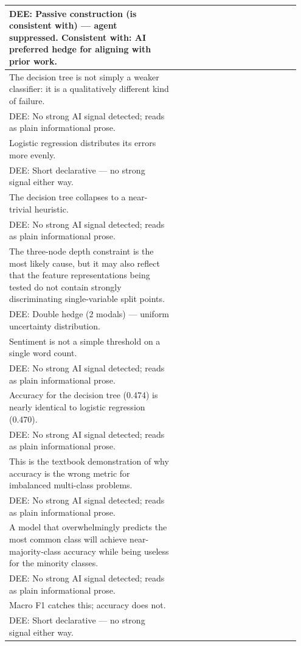 \documentclass[11pt]{article}
\begin{document}
\begin{longtable}{|p{0.55\linewidth}|p{0.40\linewidth}|}
\hline
DEE: Passive construction (is consistent with) --- agent suppressed. Consistent with: AI preferred hedge for aligning with prior work. & \\
\hline
The decision tree is not simply a weaker classifier: it is a qualitatively different kind of failure. & \\[2pt]
\hline
DEE: No strong AI signal detected; reads as plain informational prose. & \\
\hline
Logistic regression distributes its errors more evenly. & \\[2pt]
\hline
DEE: Short declarative --- no strong signal either way. & \\
\hline
The decision tree collapses to a near-trivial heuristic. & \\[2pt]
\hline
DEE: No strong AI signal detected; reads as plain informational prose. & \\
\hline
The three-node depth constraint is the most likely cause, but it may also reflect that the feature representations being tested do not contain strongly discriminating single-variable split points. & \\[2pt]
\hline
DEE: Double hedge (2 modals) --- uniform uncertainty distribution. & \\
\hline
Sentiment is not a simple threshold on a single word count. & \\[2pt]
\hline
DEE: No strong AI signal detected; reads as plain informational prose. & \\
\hline
Accuracy for the decision tree (0.474) is nearly identical to logistic regression (0.470). & \\[2pt]
\hline
DEE: No strong AI signal detected; reads as plain informational prose. & \\
\hline
This is the textbook demonstration of why accuracy is the wrong metric for imbalanced multi-class problems. & \\[2pt]
\hline
DEE: No strong AI signal detected; reads as plain informational prose. & \\
\hline
A model that overwhelmingly predicts the most common class will achieve near-majority-class accuracy while being useless for the minority classes. & \\[2pt]
\hline
DEE: No strong AI signal detected; reads as plain informational prose. & \\
\hline
Macro F1 catches this; accuracy does not. & \\[2pt]
\hline
DEE: Short declarative --- no strong signal either way. & \\

\end{longtable}
\end{document}
